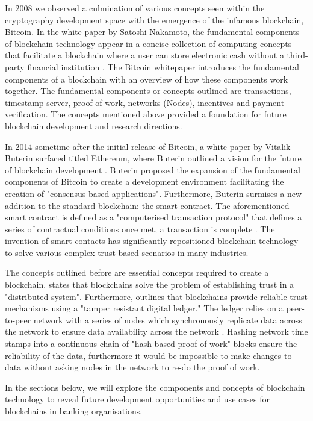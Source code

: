 In 2008 we observed a culmination of various concepts seen within the cryptography development space with the emergence of the infamous blockchain, Bitcoin. In the white paper by Satoshi Nakamoto, the fundamental components of blockchain technology appear in a concise collection of computing concepts that facilitate a blockchain where a user can store electronic cash without a third-party financial institution \autocite{nakamotoBitcoinPeertoPeerElectronic2008}. The Bitcoin whitepaper introduces the fundamental components of a blockchain with an overview of how these components work together. The fundamental components or concepts outlined are transactions, timestamp server, proof-of-work, networks (Nodes), incentives and payment verification. The concepts mentioned above provided a foundation for future blockchain development and research directions.\par
In 2014 sometime after the initial release of Bitcoin, a white paper by Vitalik Buterin surfaced titled Ethereum, where Buterin outlined a vision for the future of blockchain development \autocite{vitalikEthereumWhitepaper2014}. Buterin proposed the expansion of the fundamental components of Bitcoin to create a development environment facilitating the creation of "consensus-based applications". Furthermore, Buterin surmises a new addition to the standard blockchain: the smart contract. The aforementioned smart contract is defined as a "computerised transaction protocol" that defines a series of contractual conditions once met, a transaction is complete \autocite{yagaBlockchainTechnologyOverview2018}. The invention of smart contacts has significantly repositioned blockchain technology to solve various complex trust-based scenarios in many industries.\par
The concepts outlined before are essential concepts required to create a blockchain. \autocite{dipierroWhatBlockchain2017} states that blockchains solve the problem of establishing trust in a "distributed system". Furthermore, \autocite{yagaBlockchainTechnologyOverview2018} outlines that blockchains provide reliable trust mechanisms using a "tamper resistant digital ledger." The ledger relies on a peer-to-peer network with a series of nodes which synchronously replicate data across the network to ensure data availability across the network \autocite{butijnBlockchainsSystematicMultivocal2020}. Hashing network time stamps into a continuous chain of "hash-based proof-of-work" blocks ensure the reliability of the data, furthermore it would be impossible to make changes to data without asking nodes in the network to re-do the proof of work.\par In the sections below, we will explore the components and concepts of blockchain technology to reveal future development opportunities and use cases for blockchains in banking organisations.

